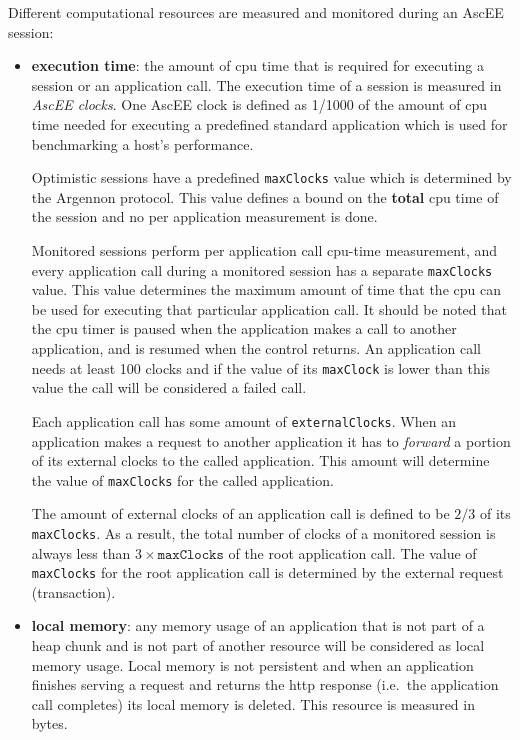 Different computational resources are measured and monitored during an AscEE session:
\begin{itemize}
    \item \textbf{execution time}:
    the amount of cpu time that is required for executing a session or an application call. The execution time of a
    session is measured in \emph{AscEE clocks}. One AscEE clock is defined as 1/1000 of the amount
    of cpu time needed for executing a predefined standard application which is used for benchmarking a host's
    performance.

    Optimistic sessions have a predefined \texttt{maxClocks} value which is determined by the Argennon protocol. This
    value defines a bound on the \textbf{total} cpu time of the session and no per application measurement is done.

    Monitored sessions perform per application call cpu-time measurement, and every application call during a monitored
    session has a separate \texttt{maxClocks} value. This value determines the maximum amount of time that the cpu
    can be used for executing that particular application call. It should be noted that the cpu timer is paused when
    the application makes a call to another application, and is resumed when the control returns. An application call
    needs at least 100 clocks and if the value of its \texttt{maxClock} is lower than this value the call will be
    considered a failed call.

    Each application call has some amount of \texttt{externalClocks}. When an application makes a request to another
    application it has to \emph{forward} a portion of its external clocks to the called application. This amount
    will determine the value of \texttt{maxClocks} for the called application.

    The amount of external clocks of an application
    call is defined to be \(2/3\) of its \texttt{maxClocks}. As a result, the total number of clocks of a monitored
    session is always less than \(3 \times \texttt{maxClocks}\) of the root application call. The value of
    \texttt{maxClocks} for
    the root application call is determined by the external request (transaction).

    \item \textbf{local memory}:
    any memory usage of an application that is not part of a heap chunk and is not part of another resource
    will be considered as local memory usage. Local memory is not persistent and when an application finishes serving a
    request and returns the http response (i.e.\ the application call completes) its local memory is deleted.
    This resource is measured in bytes.


\end{itemize}
